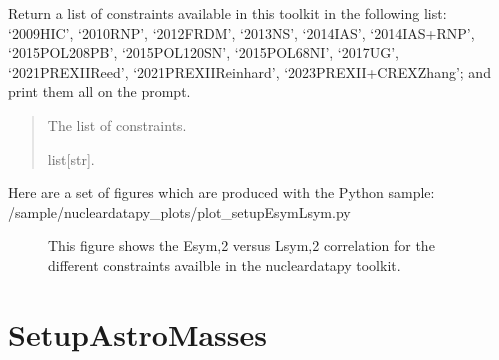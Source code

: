 \documentclass[letterpaper,10pt,english]{sphinxmanual}
\begin{document}

\begin{fulllineitems}
\label{\detokenize{source/api/setup_EsymLsym:nucleardatapy.setup_EsymLsym.constraints_EsymLsym}}
\pysigstartsignatures
\pysiglinewithargsret
{}
{}
{}
\pysigstopsignatures
\sphinxAtStartPar
Return a list of constraints available in this toolkit in the     following list: ‘2009\sphinxhyphen{}HIC’, ‘2010\sphinxhyphen{}RNP’, ‘2012\sphinxhyphen{}FRDM’, ‘2013\sphinxhyphen{}NS’,     ‘2014\sphinxhyphen{}IAS’, ‘2014\sphinxhyphen{}IAS+RNP’, ‘2015\sphinxhyphen{}POL\sphinxhyphen{}208PB’, ‘2015\sphinxhyphen{}POL\sphinxhyphen{}120SN’,     ‘2015\sphinxhyphen{}POL\sphinxhyphen{}68NI’, ‘2017\sphinxhyphen{}UG’, ‘2021\sphinxhyphen{}PREXII\sphinxhyphen{}Reed’,     ‘2021\sphinxhyphen{}PREXII\sphinxhyphen{}Reinhard’, ‘2023\sphinxhyphen{}PREXII+CREX\sphinxhyphen{}Zhang’; and     print them all on the prompt.
\begin{quote}\begin{description}
\sphinxAtStartPar
The list of constraints.

\sphinxAtStartPar
list{[}str{]}.

\end{description}\end{quote}

\end{fulllineitems}


\sphinxAtStartPar
Here are a set of figures which are produced with the Python sample: /sample/nucleardatapy\_plots/plot\_setupEsymLsym.py

\begin{figure}[htbp]
\centering
\capstart

\noindent{}
\caption{This figure shows the Esym,2 versus Lsym,2 correlation for the different constraints availble in the nucleardatapy toolkit.}\label{\detokenize{source/api/setup_EsymLsym:id1}}\end{figure}

\sphinxstepscope


\section{SetupAstroMasses}
\label{\detokenize{source/api/setup_astro_masses:setupastromasses}}\label{\detokenize{source/api/setup_astro_masses::doc}}\label{\detokenize{source/api/setup_astro_masses:module-nucleardatapy.setup_astro_masses}}
\end{document}
